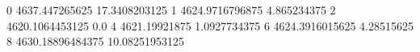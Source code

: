 0 4637.447265625 17.3408203125
1 4624.9716796875 4.865234375
2 4620.1064453125 0.0
4 4621.19921875 1.0927734375
6 4624.3916015625 4.28515625
8 4630.18896484375 10.08251953125

